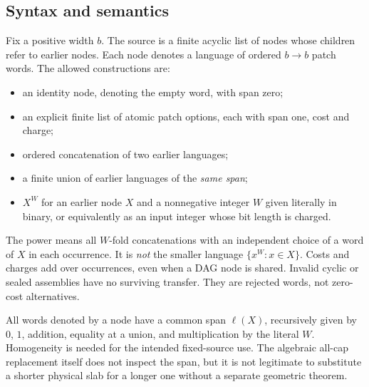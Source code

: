 \documentclass[11pt,a4paper]{article}
\theoremstyle{definition}
\begin{document}
\subsection{Syntax and semantics}
Fix a positive width $b$. The source is a finite acyclic list of nodes whose children refer to earlier nodes. Each node denotes a language of ordered $b\to b$ patch words. The allowed constructions are:
\begin{itemize}
\item an identity node, denoting the empty word, with span zero;
\item an explicit finite list of atomic patch options, each with span one, cost and charge;
\item ordered concatenation of two earlier languages;
\item a finite union of earlier languages of the \emph{same span};
\item $X^W$ for an earlier node $X$ and a nonnegative integer $W$ given literally in binary, or equivalently as an input integer whose bit length is charged.
\end{itemize}
The power means all $W$-fold concatenations with an independent choice of a word of $X$ in each occurrence. It is \emph{not} the smaller language $\{x^W:x\in X\}$. Costs and charges add over occurrences, even when a DAG node is shared. Invalid cyclic or sealed assemblies have no surviving transfer. They are rejected words, not zero-cost alternatives.

All words denoted by a node have a common span $\ell(X)$, recursively given by $0$, $1$, addition, equality at a union, and multiplication by the literal $W$. Homogeneity is needed for the intended fixed-source use. The algebraic all-cap replacement itself does not inspect the span, but it is not legitimate to substitute a shorter physical slab for a longer one without a separate geometric theorem.
\end{document}
